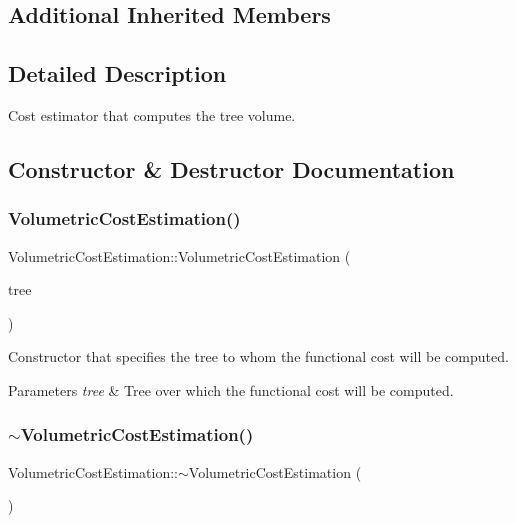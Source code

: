 \subsection*{Additional Inherited Members}


\subsection{Detailed Description}
Cost estimator that computes the tree volume. 

\subsection{Constructor \& Destructor Documentation}
\mbox{\label{class_volumetric_cost_estimation_a51639a770cca0faa91394c672f84cd5d}} 
\subsubsection{\texorpdfstring{Volumetric\+Cost\+Estimation()}{VolumetricCostEstimation()}}
{\footnotesize\ttfamily Volumetric\+Cost\+Estimation\+::\+Volumetric\+Cost\+Estimation (\begin{DoxyParamCaption}\item[{\mbox{\hyperlink{class_abstract_object_c_c_o_tree}{Abstract\+Object\+C\+C\+O\+Tree}} $\ast$}]{tree }\end{DoxyParamCaption})}

Constructor that specifies the tree to whom the functional cost will be computed. 
\begin{DoxyParams}{Parameters}
{\em tree} & Tree over which the functional cost will be computed. \\
\hline
\end{DoxyParams}
\mbox{\label{class_volumetric_cost_estimation_a6469f825673166358c7a3b78b57fb8dc}} 
\subsubsection{\texorpdfstring{$\sim$\+Volumetric\+Cost\+Estimation()}{~VolumetricCostEstimation()}}
{\footnotesize\ttfamily Volumetric\+Cost\+Estimation\+::$\sim$\+Volumetric\+Cost\+Estimation (\begin{DoxyParamCaption}{ }\end{DoxyParamCaption})\hspace{0.3cm}{\ttfamily [virtual]}}

